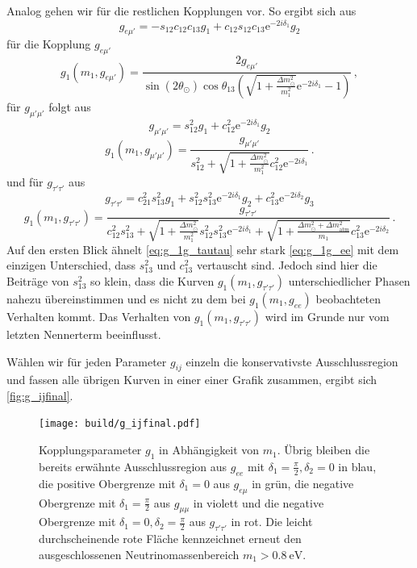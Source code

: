 Analog gehen wir für die restlichen Kopplungen vor.
So ergibt sich aus
\begin{equation*}
    g_{e \mu'} = -s_{12}c_{12}c_{13} g_1 + c_{12} s_{12} c_{13} \mathrm{e}^{-2 i \delta_1} g_2
\end{equation*}
für die Kopplung $g_{e \mu'}$
\begin{equation}
    g_1(m_1,g_{e \mu'}) = \frac{2 g_{e \mu'}}{\sin(2\theta_\odot) \cos\theta_{13} \left(\sqrt{1 + \frac{\Delta m^2_\odot}{m^2_1}} \mathrm{e}^{-2 i \delta_1} - 1\right)} \,,
    \label{eq:g_1g_emu}
\end{equation}
für $g_{\mu' \mu'}$ folgt aus
\begin{equation*}
    g_{\mu' \mu'} = s^2_{12} g_1 + c^2_{12} \mathrm{e}^{-2 i \delta_1} g_2
\end{equation*}
\begin{equation}
    g_1(m_1, g_{\mu'\mu'}) = \frac{g_{\mu'\mu'}}{s^2_{1 2} + \sqrt{1 + \frac{\Delta m^2_\odot}{m^2_1}} c^2_{12} \mathrm{e}^{-2 i \delta_1}} \,.
    \label{eq:g_1g_mumu}
\end{equation}
und für $g_{\tau' \tau'}$ aus
\begin{equation*}
    g_{\tau' \tau'} = c^2_{21} s^2_{13} g_1 + s^2_{12}s^2_{13} \mathrm{e}^{-2 i \delta_1} g_2 + c^2_{13} \mathrm{e}^{-2 i \delta_2} g_3
\end{equation*}
\begin{equation}
    g_1(m_1,g_{\tau'\tau'}) = \frac{g_{\tau'\tau'}}{c^2_{12}s^2_{13} + \sqrt{1 + \frac{\Delta m^2_\odot}{m^2_1}} s^2_{12} s^2_{13} \mathrm{e}^{-2 i \delta_1} + \sqrt{1 + \frac{\Delta m^2_\odot + \Delta m^2_\text{atm}}{m_1}}c^2_{13} \mathrm{e}^{-2 i \delta_2}}\,.
    \label{eq:g_1g_tautau}
\end{equation}
Auf den ersten Blick ähnelt \eqref{eq:g_1g_tautau} sehr stark \eqref{eq:g_1g_ee} mit dem einzigen Unterschied, dass $s^2_{13}$ und $c^2_{13}$ vertauscht sind.
Jedoch sind hier die Beiträge von $s^2_{13}$ so klein, dass die Kurven $g_1(m_1,g_{\tau'\tau'})$ unterschiedlicher Phasen nahezu übereinstimmen und es nicht zu dem bei $g_1(m_1, g_{ee})$ beobachteten Verhalten kommt.
Das Verhalten von $g_1(m_1, g_{\tau'\tau'})$ wird im Grunde nur vom letzten Nennerterm beeinflusst.

Wählen wir für jeden Parameter $g_{ij}$ einzeln die konservativste Ausschlussregion und fassen alle übrigen Kurven in einer einer Grafik zusammen, ergibt sich \autoref{fig:g_ijfinal}.
\begin{figure}[H]
    \centering
    \texttt{[image: build/g\_ijfinal.pdf]}
    \caption{Kopplungsparameter $g_1$ in Abhängigkeit von $m_1$. Übrig bleiben die bereits erwähnte Ausschlussregion aus $g_{ee}$ mit $\delta_1=\frac{\pi}{2}, \delta_2=0$ in blau, 
    die positive Obergrenze mit $\delta_1 = 0$ aus $g_{e \mu}$ in grün, die negative Obergrenze mit $\delta_1 = \frac{\pi}{2}$ aus $g_{\mu\mu}$ in violett und die negative Obergrenze mit $\delta_1 = 0, \delta_2 = \frac{\pi}{2}$ aus $g_{\tau'\tau'}$ in rot.
    Die leicht durchscheinende rote Fläche kennzeichnet erneut den ausgeschlossenen Neutrinomassenbereich $m_1 > \SI{0.8}{\eV}$.}
    \label{fig:g_ijfinal}
\end{figure}

